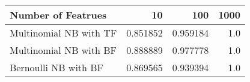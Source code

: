 \begin{tabular}{lrrr}
\toprule
Number of Featrues &      10   &      100  &  1000 \\
\midrule
Multinomial NB with TF &  0.851852 &  0.959184 &   1.0 \\
Multinomial NB with BF &  0.888889 &  0.977778 &   1.0 \\
Bernoulli NB with BF   &  0.869565 &  0.939394 &   1.0 \\
\bottomrule
\end{tabular}
